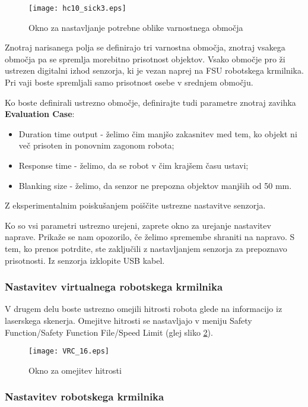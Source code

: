 \begin{figure}[!hbt]
	\centering
	\texttt{[image: hc10\_sick3.eps]}
	\caption{Okno za nastavljanje potrebne oblike varnostnega območja}
	\label{fig:hc10_sick3}
\end{figure}

Znotraj narisanega polja se definirajo tri varnostna območja, znotraj vsakega območja pa se spremlja morebitno prisotnost objektov. Vsako območje pro \v zi ustrezen digitalni izhod senzorja, ki je vezan naprej na FSU robotskega krmilnika. Pri vaji boste spremljali samo prisotnost osebe v srednjem območju.

Ko boste definirali ustrezno območje, definirajte tudi parametre znotraj zavihka \textbf{Evaluation Case}:
\begin{itemize}
	\item Duration time output - \v zelimo čim manjšo zakasnitev med tem, ko objekt ni več prisoten in ponovnim zagonom robota;
	\item Response time - \v zelimo, da se robot v čim krajšem času ustavi;
	\item Blanking size - \v zelimo, da senzor ne prepozna objektov manjših od 50 mm.
\end{itemize}

Z eksperimentalnim poiskušanjem poiščite ustrezne nastavitve senzorja.

Ko so vsi parametri ustrezno urejeni, zaprete okno za urejanje nastavitev naprave. Prikaže se nam opozorilo, če želimo spremembe shraniti na napravo. S tem, ko prenos potrdite, ste zaključili z nastavljanjem senzorja za prepoznavo prisotnosti. Iz senzorja izklopite USB kabel.

\subsubsection*{Nastavitev virtualnega robotskega krmilnika}

V drugem delu boste ustrezno omejili hitrosti robota glede na informacijo iz laserskega skenerja. Omejitve hitrosti se nastavljajo v meniju Safety Function/Safety Function File/Speed Limit (glej sliko \ref{fig:VRC_16}). 


\begin{figure}[hbt]
	\centering
	\texttt{[image: VRC\_16.eps]}
	\caption{Okno za omejitev hitrosti}
	\label{fig:VRC_16}
\end{figure}


\subsubsection*{Nastavitev robotskega krmilnika}


